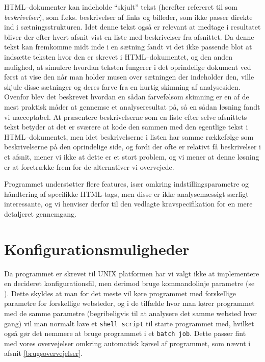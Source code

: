 \documentclass[a4paper,oneside]{memoir}
\begin{document}
HTML--dokumenter kan indeholde ``skjult'' tekst (herefter refereret til
som \textit{beskrivelser}), som f.eks. beskrivelser af links og
billeder, som ikke passer direkte ind i sætningsstrukturen. Idet denne
tekst også er relevant at medtage i resultatet bliver der efter hvert
afsnit vist en liste med beskrivelser fra afsnittet. Da denne tekst
kan fremkomme midt inde i en sætning fandt vi det ikke passende blot
at indsætte teksten hvor den er skrevet i HTML--dokumentet, og den
anden mulighed, at simulere hvordan teksten fungerer i det oprindelige
dokument ved først at vise den når man holder musen over sætningen der
indeholder den, ville skjule disse sætninger og deres farve fra en
hurtig skimning af analysesiden. Ovenfor blev det beskrevet hvordan en
sådan farvefølsom skimning er en af de mest praktisk måder at gennemse
et analyseresultat på, så en sådan løsning fandt vi uacceptabel. At
præsentere beskrivelserne som en liste efter selve afsnittets tekst
betyder at det er sværere at kode den sammen med den egentlige tekst i
HTML--dokumentet, men idet beskrivelserne i listen har samme rækkefølge
som beskrivelserne på den oprindelige side, og fordi der ofte er
relativt få beskrivelser i et afsnit, mener vi ikke at dette er et
stort problem, og vi mener at denne løsning er at foretrække frem for
de alternativer vi overvejede.

Programmet understøtter flere features, især omkring
indstillingsparametre og håndtering af specifikke HTML-tags, men disse
er ikke analysemæssigt særligt interessante, og vi henviser derfor til
den vedlagte kravspecifikation for en mere detaljeret gennemgang.

\section{Konfigurationsmuligheder}
\label{konfigurationsmuligheder}
Da programmet er skrevet til UNIX platformen har vi valgt ikke at
implementere en decideret konfigurationsfil, men derimod bruge
kommandolinje parametre (se \cite{artofunixbook}). Dette skyldes at
man for det meste vil køre programmet med forskellige parametre for
forskellige websteder, og i de tilfælde hvor man kører programmet med
de samme parametre (begribeligvis til at analysere det samme websted
hver gang) vil man normalt lave et \texttt{shell script} til starte
programmet med, hvilket også gør det nemmere at bruge programmet i et
\texttt{batch job}. Dette passer fint med vores overvejelser omkring
automatisk kørsel af programmet, som nævnt i afsnit
\ref{brugsovervejelser}.
\end{document}
